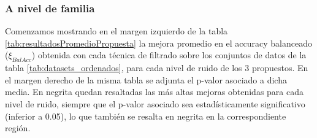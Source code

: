 \documentclass[print, color]{ugrTFG}
\begin{document}
 \subsubsection{A nivel de familia}
 Comenzamos mostrando en el margen izquierdo de la tabla \ref{tab:resultadosPromedioPropuesta} la mejora promedio en el accuracy balanceado ($\xi_{BalAcc}$) obtenida con cada técnica de filtrado sobre los conjuntos de datos de la tabla \ref{tab:datasets_ordenados}, para cada nivel de ruido de los 3 propuestos. En el margen derecho de la misma tabla se adjunta el p-valor asociado a dicha media. En negrita quedan resaltadas las más altas mejoras obtenidas para cada nivel de ruido, siempre que el p-valor asociado sea estadísticamente significativo (inferior a 0.05), lo que también se resalta en negrita en la correspondiente región.\\
\end{document}
